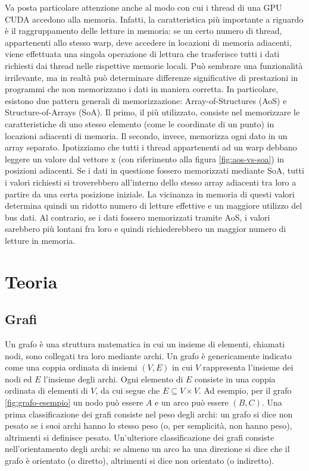 \documentclass[12pt,a4paper,oneside]{book}
\begin{document}
	Va posta particolare attenzione anche al modo con cui i thread di una GPU CUDA accedono alla memoria. Infatti, la caratteristica più importante a riguardo è il raggruppamento delle letture in memoria: se un certo numero di thread, appartenenti allo stesso warp, deve accedere in locazioni di memoria adiacenti, viene effettuata una singola operazione di lettura che trasferisce tutti i dati richiesti dai thread nelle rispettive memorie locali. Può sembrare una funzionalità irrilevante, ma in realtà può determinare differenze significative di prestazioni in programmi che non memorizzano i dati in maniera corretta. In particolare, esistono due pattern generali di memorizzazione: Array-of-Structures (AoS) e Structure-of-Arrays (SoA). Il primo, il più utilizzato, consiste nel memorizzare le caratteristiche di uno stesso elemento (come le coordinate di un punto) in locazioni adiacenti di memoria. Il secondo, invece, memorizza ogni dato in un array separato. Ipotizziamo che tutti i thread appartenenti ad un warp debbano leggere un valore dal vettore x (con riferimento alla figura \ref{fig:aos-vs-soa}) in posizioni adiacenti. Se i dati in questione fossero memorizzati mediante SoA, tutti i valori richiesti si troverebbero all'interno dello stesso array adiacenti tra loro a partire da una certa posizione iniziale. La vicinanza in memoria di questi valori determina quindi un ridotto numero di letture effettive e un maggiore utilizzo del bus dati. Al contrario, se i dati fossero memorizzati tramite AoS, i valori sarebbero più lontani fra loro e quindi richiederebbero un maggior numero di letture in memoria.
	
	\chapter{Teoria}
	\label{chap:teoria}
	\section{Grafi}
	Un grafo è una struttura matematica in cui un insieme di elementi, chiamati nodi, sono collegati tra loro mediante archi. Un grafo è genericamente indicato come una coppia ordinata di insiemi $(V,E)$ in cui $V$ rappresenta l'insieme dei nodi ed $E$ l'insieme degli archi. Ogni elemento di $E$ consiste in una coppia ordinata di elementi di $V$, da cui segue che $E \subseteq V \times V$. Ad esempio, per il grafo \ref{fig:grafo-esempio} un nodo può essere $A$ e un arco può essere $(B,C)$. Una prima classificazione dei grafi consiste nel peso degli archi: un grafo si dice non pesato se i suoi archi hanno lo stesso peso (o, per semplicità, non hanno peso), altrimenti si definisce pesato. Un'ulteriore classificazione dei grafi consiste nell'orientamento degli archi: se almeno un arco ha una direzione si dice che il grafo è orientato (o diretto), altrimenti si dice non orientato (o indiretto).
\end{document}
